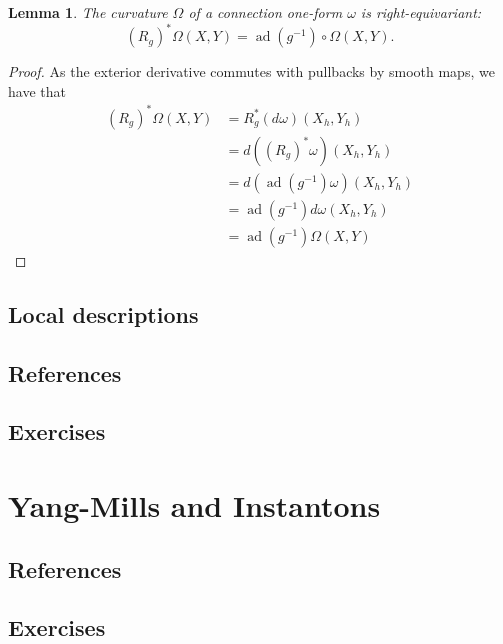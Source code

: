 \documentclass{book}
\DeclareMathOperator{\ad}{ad}
\theoremstyle{plain}
\newtheorem{lem}[thm]{Lemma}
\theoremstyle{definition}
\theoremstyle{remark}
\begin{document}
\begin{lem}
The curvature $\Omega$ of a connection one-form $\omega$ is right-equivariant:
\[(R_g)^*\Omega(X,Y)=\ad(g^{-1})\circ \Omega(X,Y).\]
\end{lem}
\begin{proof}
As the exterior derivative commutes with pullbacks by smooth maps, we have that
\begin{align*}
(R_g)^*\Omega(X,Y)&=R_g^*(d\omega)(X_h,Y_h)\\
&=d((R_g)^*\omega)(X_h,Y_h)\\
&=d(\ad(g^{-1})\omega)(X_h,Y_h)\\
&=\ad(g^{-1})d\omega(X_h,Y_h)\\
&=\ad(g^{-1})\Omega(X,Y)
\end{align*}
\end{proof}


\section{Local descriptions}
\section{References}
\section{Exercises}













\chapter{Yang-Mills and Instantons}
\section{References}
\section{Exercises}
\end{document}
